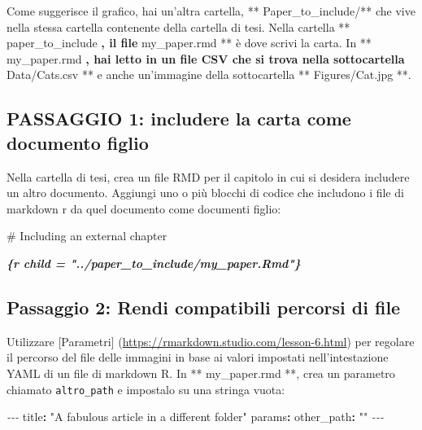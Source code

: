 \documentclass[a4paper, 11pt, nobind]{templates/ociamthesis}
\newenvironment{Shaded}{\begin{snugshade}}{\end{snugshade}}
\newcommand{\AttributeTok}[1]{\textcolor[rgb]{0.77,0.63,0.00}{#1}}
\newcommand{\FunctionTok}[1]{\textcolor[rgb]{0.00,0.00,0.00}{#1}}
\newcommand{\InformationTok}[1]{\textcolor[rgb]{0.56,0.35,0.01}{\textbf{\textit{#1}}}}
\newcommand{\KeywordTok}[1]{\textcolor[rgb]{0.13,0.29,0.53}{\textbf{#1}}}
\newcommand{\PreprocessorTok}[1]{\textcolor[rgb]{0.56,0.35,0.01}{\textit{#1}}}
\newcommand{\StringTok}[1]{\textcolor[rgb]{0.31,0.60,0.02}{#1}}
\renewenvironment{Shaded}
{
  \vspace{10pt}%
  \begin{snugshade}%
}{%
  \end{snugshade}%
  \vspace{8pt}%
}
\begin{document}
Come suggerisce il grafico, hai un'altra cartella, ** Paper\_to\_include/** che vive nella stessa cartella contenente della cartella di tesi.
Nella cartella ** paper\_to\_include \textbf{, il file } my\_paper.rmd ** è dove scrivi la carta.
In ** my\_paper.rmd \textbf{, hai letto in un file CSV che si trova nella sottocartella } Data/Cats.csv ** e anche un'immagine della sottocartella ** Figures/Cat.jpg **.

\hypertarget{passaggio-1-includere-la-carta-come-documento-figlio}{%
\subsection{PASSAGGIO 1: includere la carta come documento figlio}\label{passaggio-1-includere-la-carta-come-documento-figlio}}

Nella cartella di tesi, crea un file RMD per il capitolo in cui si desidera includere un altro documento.
Aggiungi uno o più blocchi di codice che includono i file di markdown r da quel documento come documenti figlio:

\begin{Shaded}
\begin{Highlighting}[]
\FunctionTok{\# Including an external chapter }

\InformationTok{\textasciigrave{}\textasciigrave{}\textasciigrave{}\{r child = "../paper\_to\_include/my\_paper.Rmd"\}}
\InformationTok{\textasciigrave{}\textasciigrave{}\textasciigrave{}}
\end{Highlighting}
\end{Shaded}

\hypertarget{passaggio-2-rendi-compatibili-percorsi-di-file}{%
\subsection{Passaggio 2: Rendi compatibili percorsi di file}\label{passaggio-2-rendi-compatibili-percorsi-di-file}}

Utilizzare {[}Parametri{]} (\url{https://rmarkdown.studio.com/lesson-6.html}) per regolare il percorso del file delle immagini in base ai valori impostati nell'intestazione YAML di un file di markdown R.
In ** my\_paper.rmd **, crea un parametro chiamato \texttt{altro\_path} e impostalo su una stringa vuota:

\begin{Shaded}
\begin{Highlighting}[]
\PreprocessorTok{{-}{-}{-}}
\FunctionTok{title}\KeywordTok{:}\AttributeTok{ }\StringTok{"A fabulous article in a different folder"}
\FunctionTok{params}\KeywordTok{:}
\AttributeTok{  }\FunctionTok{other\_path}\KeywordTok{:}\AttributeTok{ }\StringTok{""}
\PreprocessorTok{{-}{-}{-}}
\end{Highlighting}
\end{Shaded}
\end{document}
